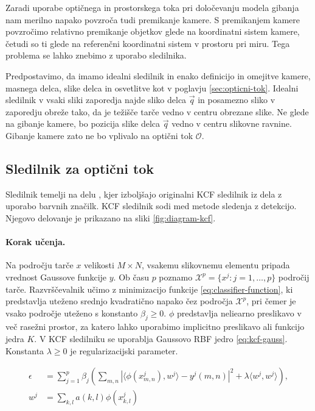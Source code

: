 Zaradi uporabe optičnega in prostorskega toka pri določevanju modela gibanja nam merilno napako povzroča tudi premikanje kamere. S premikanjem kamere povzročimo relativno premikanje objetkov glede na koordinatni sistem kamere, četudi so ti glede na referenčni koordinatni sistem v prostoru pri miru. Tega problema se lahko znebimo z uporabo sledilnika. 

Predpostavimo, da imamo idealni sledilnik in enako definicijo in omejitve kamere, masnega delca, slike delca in osvetlitve kot v poglavju \ref{sec:opticni-tok}. Idealni sledilnik v vsaki sliki zaporedja najde sliko delca $\vec{q}$ in posamezno sliko v zaporedju obreže tako, da je težišče tarče vedno v centru obrezane slike. Ne glede na gibanje kamere, bo pozicija slike delca $\vec{q}$ vedno v centru slikovne ravnine. Gibanje kamere zato ne bo vplivalo na optični tok $\mathcal{O}$.



\subsection{Sledilnik za optični tok} 
Sledilnik temelji na delu \cite{danelljan2014adaptive}, kjer izboljšajo originalni KCF sledilnik iz dela \cite{henriques2012exploiting} z uporabo barvnih značilk. KCF sledilnik sodi med metode sledenja z detekcijo. Njegovo delovanje je prikazano na sliki \ref{fig:diagram-kcf}.

\paragraph{Korak učenja.}
Na področju tarče $x$ velikosti $M \times N$, vsakemu slikovnemu elementu pripada vrednost Gaussove funkcije $y$. Ob času $p$ poznamo $\mathcal{X}^p = \{x^j: j=1,\ldots,p\}$ področij tarče. Razvrščevalnik učimo z minimizacijo funkcije \eqref{eq:classifier-function}, ki predstavlja uteženo srednjo kvadratično napako čez področja $\mathcal{X}^p$, pri čemer je vsako področje uteženo s konstanto $\beta_j \geq 0$. $\phi$ predstavlja neliearno preslikavo v več rasežni prostor, za katero lahko uporabimo implicitno preslikavo ali funkcijo jedra $K$. V KCF sledilniku se uporablja Gaussovo RBF jedro \eqref{eq:kcf-gauss}. Konstanta $\lambda \geq 0$ je regularizacijski parameter.

\begin{equation}
\begin{aligned}
\epsilon &= \sum_{j=1}^p \beta_j \left( 
	\sum_{m,n} \left| \langle \phi\left(x_{m,n}^j \right), w^j \rangle - y^j(m,n) \right|^2
    + \lambda \langle w^j, w^j \rangle
\right), \\
w^j &= \sum_{k,l} a(k,l) \phi\left(x_{k,l}^j  \right)
\end{aligned}
\label{eq:classifier-function}
\end{equation}

